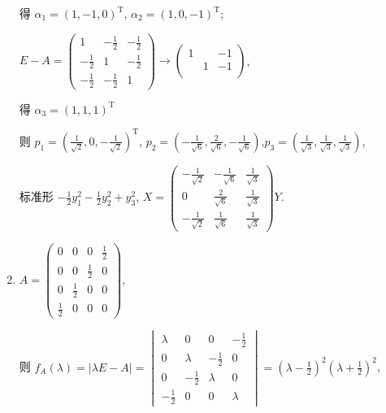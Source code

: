 \begin{enumerate}
			       得 \(\alpha_{1} = (1, -1, 0)^{\mathrm{T}} \), \( \alpha_{2} = (1, 0, -1)^{\mathrm{T}} \);

			       \( E - A = \begin{pmatrix}
				       1            & -\frac{1}{2} & -\frac{1}{2} \\
				       -\frac{1}{2} & 1            & -\frac{1}{2} \\
				       -\frac{1}{2} & -\frac{1}{2} & 1
			       \end{pmatrix} \rightarrow \begin{pmatrix}
				       1 &   & -1 \\
				         & 1 & -1 \\
				         &   &
			       \end{pmatrix}\),

			       得 \(\alpha_{3} = (1, 1, 1)^{\mathrm{T}} \)

			       则 \( p_{1} = \left(\frac{1}{\sqrt{2}}, 0, -\frac{1}{\sqrt{2}}\right)^{\mathrm{T}} \), \( p_{2} = \left(-\frac{1}{\sqrt{6}}, \frac{2}{\sqrt{6}}, -\frac{1}{\sqrt{6}}\right) \),\newline \( p_{3} = \left(\frac{1}{\sqrt{3}}, \frac{1}{\sqrt{3}}, \frac{1}{\sqrt{3}}\right) \),

			       标准形 \( -\frac{1}{2}y_{1}^{2} - \frac{1}{2}y_{2}^{2} + y_{3}^{2} \), \( X = \begin{pmatrix}
				       -\frac{1}{\sqrt{2}} & -\frac{1}{\sqrt{6}} & \frac{1}{\sqrt{3}} \\
				       0                   & \frac{2}{\sqrt{6}}  & \frac{1}{\sqrt{3}} \\
				       -\frac{1}{\sqrt{2}} & \frac{1}{\sqrt{6}}  & \frac{1}{\sqrt{3}}
			       \end{pmatrix}Y. \)

			 \item %
			       \( A = \begin{pmatrix}
				       0           & 0           & 0           & \frac{1}{2} \\
				       0           & 0           & \frac{1}{2} & 0           \\
				       0           & \frac{1}{2} & 0           & 0           \\
				       \frac{1}{2} & 0           & 0           & 0
			       \end{pmatrix} \),

			       则 \( f_{A}(\lambda) = |\lambda E - A| = \begin{vmatrix}
				       \lambda      & 0            & 0            & -\frac{1}{2} \\
				       0            & \lambda      & -\frac{1}{2} & 0            \\
				       0            & -\frac{1}{2} & \lambda      & 0            \\
				       -\frac{1}{2} & 0            & 0            & \lambda
			       \end{vmatrix} = (\lambda - \frac{1}{2})^{2}(\lambda + \frac{1}{2})^{2} \),


\end{enumerate}

